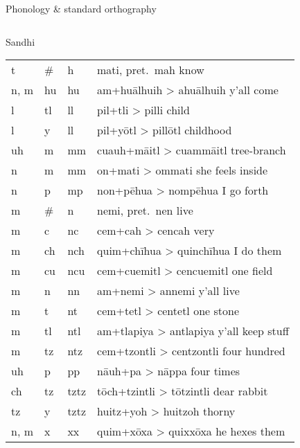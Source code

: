 \documentclass[12pt]{beamer}
\newcommand{\nah}[1]{\textcolor{nahgrn}{#1}}
\newcommand{\trs}[1]{\textcolor{nahblu}{#1}}
\begin{document}
\begin{frame}
\begin{columns}[t]
\begin{column}{.22\linewidth}
\begin{block}{Phonology \& standard orthography}
\begin{threeparttable}
\begin{tablenotes}
\begin{frame}
\begin{columns}[t]
\begin{column}{.25\linewidth}
\begin{block}{Sandhi}
\begin{threeparttable}
\begin{tabular}{l@{+}l@{>}ll}
            \nah{t} & \nah{\#} & \nah{h} & \nah{mati}, pret.~\nah{mah} \trs{know} \\
            \nah{n, m} & \nah{hu} & \nah{hu} & \nah{am}+\nah{huālhuih} > \nah{ahuālhuih} \trs{y'all come} \\
            \nah{l} & \nah{tl} & \nah{ll} & \nah{pil}+\nah{tli} > \nah{pilli} \trs{child} \\
            \nah{l} & \nah{y} & \nah{ll} & \nah{pil}+\nah{yōtl} > \nah{pillōtl} \trs{childhood} \\
            \nah{uh} & \nah{m} & \nah{mm} & \nah{cuauh}+\nah{māitl} > \nah{cuammāitl} \trs{tree-branch} \\
            \nah{n} & \nah{m} & \nah{mm} & \nah{on}+\nah{mati} > \nah{ommati} \trs{she feels inside} \\
            \nah{n} & \nah{p} & \nah{mp} & \nah{non}+\nah{pēhua} > \nah{nompēhua} \trs{I go forth} \\
            \nah{m} & \nah{\#} & \nah{n} & \nah{nemi}, pret.~\nah{nen} \trs{live} \\
            \nah{m} & \nah{c} & \nah{nc} & \nah{cem}+\nah{cah} > \nah{cencah} \trs{very} \\
            \nah{m} & \nah{ch} & \nah{nch} & \nah{quim}+\nah{chīhua} > \nah{quinchīhua} \trs{I do them} \\
            \nah{m} & \nah{cu} & \nah{ncu} & \nah{cem}+\nah{cuemitl} > \nah{cencuemitl} \trs{one field} \\
            \nah{m} & \nah{n} & \nah{nn} & \nah{am}+\nah{nemi} > \nah{annemi} \trs{y'all live} \\
            \nah{m} & \nah{t} & \nah{nt} & \nah{cem}+\nah{tetl} > \nah{centetl} \trs{one stone} \\
            \nah{m} & \nah{tl} & \nah{ntl} & \nah{am}+\nah{tlapiya} > \nah{antlapiya} \trs{y'all keep stuff} \\
            \nah{m} & \nah{tz} & \nah{ntz} & \nah{cem}+\nah{tzontli} > \nah{centzontli} \trs{four hundred} \\
            \nah{uh} & \nah{p} & \nah{pp} & \nah{nāuh}+\nah{pa} > \nah{nāppa} \trs{four times} \\
            \nah{ch} & \nah{tz} & \nah{tztz}\tnote{1} & \nah{tōch}+\nah{tzintli} > \nah{tōtzintli} \trs{dear rabbit} \\
            \nah{tz} & \nah{y} & \nah{tztz}\tnote{1} & \nah{huitz}+\nah{yoh} > \nah{huitzoh} \trs{thorny} \\
            \nah{n, m} & \nah{x} & \nah{xx}\tnote{1} & \nah{quim}+\nah{xōxa} > \nah{quixxōxa} \trs{he hexes them} \\

\end{tabular}
\end{threeparttable}
\end{block}
\end{column}
\end{columns}
\end{frame}
\end{tablenotes}
\end{threeparttable}
\end{block}
\end{column}
\end{columns}
\end{frame}
\end{document}
